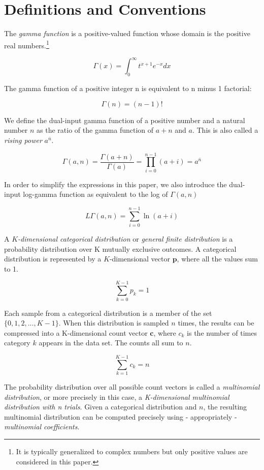 \documentclass[twoside]{article}
\begin{document}
\section{Definitions and Conventions}

The \textit{gamma function} is a positive-valued function whose domain is the positive real numbers.\footnote{It is typically generalized to complex numbers but only positive values are considered in this paper.}

\[\Gamma(x)=\int_0^\infty t^{x+1}e^{-x}dx\]

The gamma function of a positive integer n is equivalent to n minus 1 factorial:

\[\Gamma(n)=(n-1)!\]

We define the dual-input gamma function of a positive number and a natural number \(n\) as the ratio of the gamma function of \(a + n\) and \(a\). This is also called a \textit{rising power}\cite{concrete} \(a^{\bar{n}}\).

\[\Gamma(a,n)=\frac{\Gamma(a+n)}{\Gamma(a)}=\prod_{i=0}^{n-1}(a+i)=a^{\bar{n}}\]

In order to simplify the expressions in this paper, we also introduce the dual-input log-gamma function as equivalent to the log of \(\Gamma(a, n)\)

\[L\Gamma(a,n)=\sum_{i=0}^{n-1}\ln(a+i)\]

A \textit{\(K\)-dimensional categorical distribution} or \textit{general finite distribution}\cite{ng} is a probability distribution over K mutually exclusive outcomes.  A categorical distribution is represented by a \(K\)-dimensional vector $\mathbf{p}$, where all the values sum to 1.

\[\sum_{k=0}^{K-1}p_k=1\]

Each sample from a categorical distribution is a member of the set \(\{0, 1, 2, ..., K-1\}\). When this distribution is sampled \(n\) times, the results can be compressed into a  K-dimensional count vector \(\mathbf{c}\), where \(c_k\) is the number of times category \(k\) appears in the data set.  The counts all sum to $n$.

\[\sum_{k=1}^{K-1}c_k=n\]

The probability distribution over all possible count vectors is called a \textit{multinomial distribution}, or more precisely in this case, a \textit{K-dimensional multinomial distribution with n trials}. Given a categorical distribution and \(n\), the resulting multinomial distribution can be computed precisely using - appropriately - \textit{multinomial coefficients}.
\end{document}
